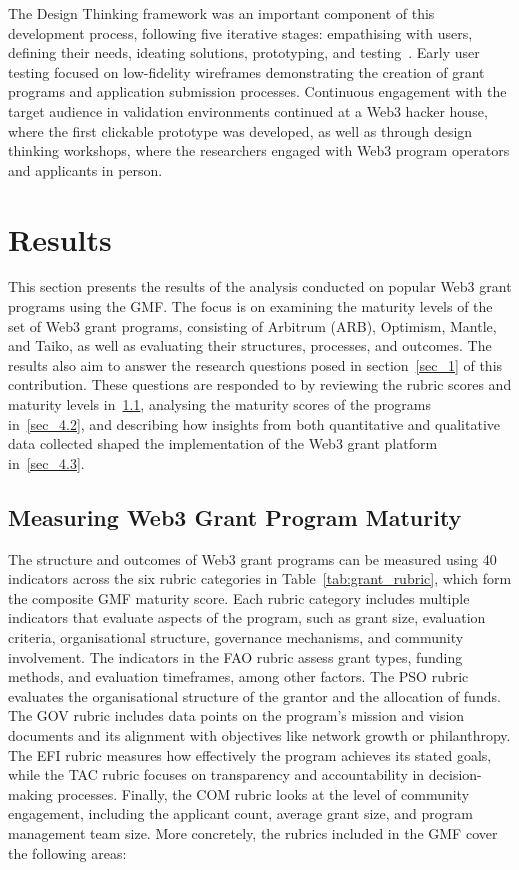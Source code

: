 \documentclass[conference]{IEEEtran}
\begin{document}
The Design Thinking framework was an important component of this development process, following five iterative stages: empathising with users, defining their needs, ideating solutions, prototyping, and testing~\cite{ambrose_basics_2010,wolniak_design_2017}. Early user testing focused on low-fidelity wireframes demonstrating the creation of grant programs and application submission processes. Continuous engagement with the target audience in validation environments continued at a Web3 hacker house, where the first clickable prototype was developed, as well as through design thinking workshops, where the researchers engaged with Web3 program operators and applicants in person.

\section{Results}\label{sec_4}

This section presents the results of the analysis conducted on popular Web3 grant programs using the GMF. The focus is on examining the maturity levels of the set of Web3 grant programs, consisting of Arbitrum (ARB), Optimism, Mantle, and Taiko, as well as evaluating their structures, processes, and outcomes. The results also aim to answer the research questions posed in section~\ref{sec_1} of this contribution. These questions are responded to by reviewing the rubric scores and maturity levels in~\ref{sec_4.1}, analysing the maturity scores of the programs in~\ref{sec_4.2}, and describing how insights from both quantitative and qualitative data collected shaped the implementation of the Web3 grant platform in~\ref{sec_4.3}.

\subsection{Measuring Web3 Grant Program Maturity}\label{sec_4.1}

The structure and outcomes of Web3 grant programs can be measured using 40 indicators across the six rubric categories in Table~\ref{tab:grant_rubric}, which form the composite GMF maturity score. Each rubric category includes multiple indicators that evaluate aspects of the program, such as grant size, evaluation criteria, organisational structure, governance mechanisms, and community involvement. The indicators in the FAO rubric assess grant types, funding methods, and evaluation timeframes, among other factors. The PSO rubric evaluates the organisational structure of the grantor and the allocation of funds. The GOV rubric includes data points on the program's mission and vision documents and its alignment with objectives like network growth or philanthropy. The EFI rubric measures how effectively the program achieves its stated goals, while the TAC rubric focuses on transparency and accountability in decision-making processes. Finally, the COM rubric looks at the level of community engagement, including the applicant count, average grant size, and program management team size. More concretely, the rubrics included in the GMF cover the following areas:\\
\end{document}
